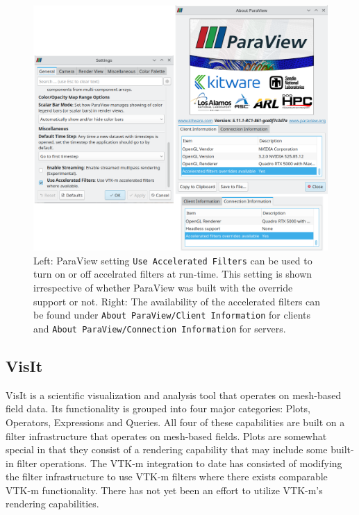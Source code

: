 \begin{figure}[htb]
  \includegraphics[width=\linewidth]{figures/pv-override-settings.png}
  \caption{Left: ParaView setting \texttt{Use Accelerated Filters} can be used to turn on or off accelrated filters at run-time. This setting is shown irrespective of whether ParaView was built with the override support or not. Right: The availability of the accelerated filters can be found under \texttt{About ParaView/Client Information} for clients and \texttt{About ParaView/Connection Information} for servers.}
  \label{fig:paraview_settings}
\end{figure}


\subsection{VisIt}

VisIt is a scientific visualization and analysis tool that operates on mesh-based field data. Its functionality is grouped into four major categories: Plots, Operators, Expressions and Queries. All four of these capabilities are built on a filter infrastructure that operates on mesh-based fields. Plots are somewhat special in that they consist of a rendering capability that may include some built-in filter operations. The VTK-m integration to date has consisted of modifying the filter infrastructure to use VTK-m filters where there exists comparable VTK-m functionality. There has not yet been an effort to utilize VTK-m’s rendering capabilities.

